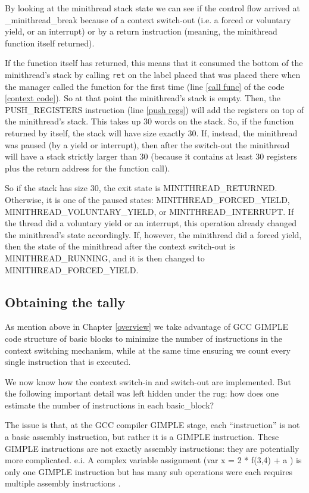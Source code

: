 \documentclass[12pt,a4paper]{report}
\begin{document}
By looking at the minithread stack state we can see if the control flow arrived at \_minithread\_break because of a context switch-out (i.e. a forced or voluntary yield, or an interrupt) or by a return instruction (meaning, the minithread function itself returned).

If the function itself has returned, this means that it consumed the bottom of the minithread's stack by calling {\tt ret} on the label placed that was placed there when the manager called the function for the first time (line \ref{call func} of the code \ref{context code}). So at that point the minithread's stack is empty. Then, the PUSH\_REGISTERS instruction (line \ref{push regs}) will add the registers on top of the minithread's stack. This takes up 30 words on the stack. So, if the function returned by itself, the stack will have size exactly 30.  If, instead, the minithread was paused (by a yield or interrupt), then after the switch-out the minithread will have a stack strictly larger than 30 (because it contains at least 30 registers plus the return address for the function call).

So if the stack has size 30, the exit state is MINITHREAD\_RETURNED. Otherwise, it is one of the paused states: MINITHREAD\_FORCED\_YIELD,\\ MINITHREAD\_VOLUNTARY\_YIELD, or MINITHREAD\_INTERRUPT. If the thread did a voluntary yield or an interrupt, this operation already changed the minithread's state accordingly. If, however, the minithread did a forced yield, then the state of the minithread after the context switch-out is MINITHREAD\_RUNNING, and it is then changed to MINITHREAD\_FORCED\_YIELD.
 

\subsection{Obtaining the tally}\label{instrumentation estimate}

As mention above in Chapter \ref{overview} we take advantage of GCC GIMPLE code structure of basic blocks to minimize the number of instructions in the context switching mechanism, while at the same time ensuring we count every single instruction that is executed.

We now know how the context switch-in and switch-out are implemented. But the following important detail was left hidden under the rug: how does one estimate the number of instructions in each basic\_block?

The issue is that, at the GCC compiler GIMPLE stage, each ``instruction'' is not a basic assembly instruction, but rather it is a GIMPLE instruction. These GIMPLE instructions are not exactly assembly instructions: they are potentially more complicated. e.i. A complex variable assignment (var x = 2 * f(3,4) + a ) is only one GIMPLE instruction but has many sub operations were each requires multiple assembly instructions .  
\end{document}
